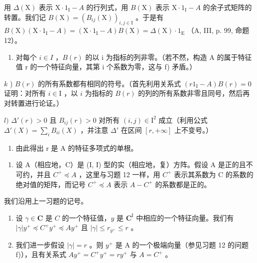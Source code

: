 用 \(\Delta(\mathrm{X})\) 表示 \(\mathrm{X} \cdot 1_{\mathrm{I}} - A\) 的行列式，用 \(B(\mathrm{X})\) 表示 \(\mathrm{X} \cdot 1_{\mathrm{I}} - A\) 的余子式矩阵的转置。我们记 \(B(\mathrm{X}) = (B_{ij}(\mathrm{X}))_{i,j \in \mathrm{I}}\) 。于是有 \(B(\mathrm{X})(\mathrm{X} \cdot 1_{\mathrm{I}} - A) = (\mathrm{X} \cdot 1_{\mathrm{I}} - A)B(\mathrm{X}) = \Delta(\mathrm{X}) \cdot 1_{\mathrm{E}}\) （A, III, p. 99, 命题 12）。

\begin{enumerate}
\def\labelenumi{\alph{enumi})}
\setcounter{enumi}{9}
\tightlist
\item
  对每个 \(i \in I\) ，\(B(r)\) 的以 i 为指标的列非零。（若不然，构造 A 的属于特征值 r 的一个特征向量，其第 i 个系数为零，这与 f) 矛盾。）
\end{enumerate}

\(k\) ) \(B(r)\) 的所有系数都有相同的符号。（首先利用关系式 \((r1_{\mathrm{I}} - A)B(r) = 0\) 证明：对所有 \(i\in \mathrm{I}\) ，以 \(i\) 为指标的 \(B(r)\) 的列的所有系数非零且同号，然后再对转置进行论证。）

\(l)\) \(\Delta'(r) > 0\) 且 \(B_{ij}(r) > 0\) 对所有 \((i,j) \in \mathrm{I}^2\) 成立（利用公式 \(\Delta'(X) = \sum_i B_{ii}(X)\) ，并注意 \(\Delta'\) 在区间 \([r, +\infty]\) 上不变号。）

\begin{enumerate}
\def\labelenumi{\alph{enumi})}
\setcounter{enumi}{12}
\tightlist
\item
  由此得出 r 是 A 的特征多项式的单根。
\end{enumerate}

\begin{enumerate}
\def\labelenumi{\arabic{enumi})}
\setcounter{enumi}{12}
\tightlist
\item
  设 A（相应地，C）是 (I, I) 型的实（相应地，复）方阵。假设 A 是正的且不可约，并且 \(C^{+} \preccurlyeq A\) ，这里与习题 12 一样，用 \(C^{+}\) 表示其系数为 C 的系数的绝对值的矩阵，而记号 \(C^{+} \preccurlyeq A\) 表示 \(A - C^{+}\) 的系数都是正的。
\end{enumerate}

我们沿用上一习题的记号。

\begin{enumerate}
\def\labelenumi{\alph{enumi})}
\item
  设 \(\gamma \in \mathbf{C}\) 是 \(C\) 的一个特征值，\(y\) 是 \(\mathbf{C}^{\mathrm{I}}\) 中相应的一个特征向量。我们有 \(|\gamma|y^{+} \preccurlyeq C^{+}y^{+} \preccurlyeq Ay^{+}\) 且 \(|\gamma| \leqslant r_{y^{+}} \leqslant r\) 。
\item
  我们进一步假设 \(|\gamma| = r\) 。则 \(y^{+}\) 是 A 的一个极端向量（参见习题 12 的问题 f)），且有关系式 \(Ay^{+} = C^{+}y^{+} = ry^{+}\) 与 \(A = C^{+}\) 。
\end{enumerate}

